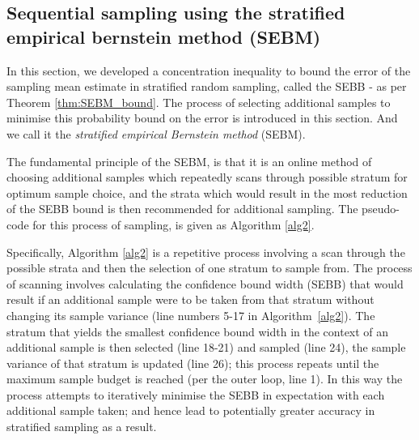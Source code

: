 \subsection{Sequential sampling using the stratified empirical bernstein method (SEBM)} \label{sec:SEBMalgorithm}



In this section, we developed a concentration inequality to bound the error of the sampling mean estimate in stratified random sampling, called the SEBB - as per Theorem \ref{thm:SEBM_bound}.
The process of selecting additional samples to minimise this probability bound on the error is introduced in this section. And we call it the \textit{stratified empirical Bernstein method} (SEBM).

The fundamental principle of the SEBM, is that it is an online method of choosing additional samples which repeatedly scans through possible stratum for optimum sample choice, and the strata which would result in the most reduction of the SEBB bound is then recommended for additional sampling.
The pseudo-code for this process of sampling, is given as Algorithm \ref{alg2}.


Specifically, Algorithm \ref{alg2} is a repetitive process involving a scan through the possible strata and then the selection of one stratum to sample from.
The process of scanning involves calculating the confidence bound width (SEBB) that would result if an additional sample were to be taken from that stratum without changing its sample variance (line numbers 5-17 in Algorithm~\ref{alg2}).
The stratum that yields the smallest confidence bound width in the context of an additional sample is then selected (line 18-21) and sampled (line 24), the sample variance of that stratum is updated (line 26); 
this process repeats until the maximum sample budget is reached (per the outer loop, line 1).
In this way the process attempts to iteratively minimise the SEBB in expectation with each additional sample taken; and hence lead to potentially greater accuracy in stratified sampling as a result.

